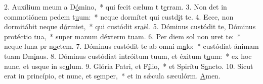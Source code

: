 2. Auxílium meum a D\uline{ó}mino,~* qui fecit cælum t t\uline{e}rram.
3. Non det in commotiónem pedem t\uline{u}um:~* neque dormítet qui custd\uline{i}t te.
4. Ecce, non dormitábit neque d\uline{ó}rmiet,~* qui custódit sr\uline{a}ël.
5. Dóminus custódit te, Dóminus protéctio t\uline{u}a,~* super manum déxterm t\uline{u}am.
6. Per diem sol non \uline{u}ret te:~* neque luna pr n\uline{o}ctem.
7. Dóminus custódit te ab omni m\uline{a}lo:~* custódiat ánimam tuam Dm\uline{i}nus.
8. Dóminus custódiat intróitum tuum, et éxitum t\uline{u}um:~* ex hoc nunc, et usque in sc\uline{u}lum.
9. Glória Patri, et F\uline{í}lio,~* et Spirítu S\uline{a}ncto.
10. Sicut erat in princípio, et nunc, et s\uline{e}mper,~* et in sǽcula sæculórm. \uline{A}men.
